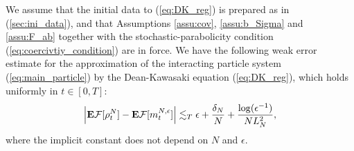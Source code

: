 \begin{thm}\label{thm:main_weak_error}We assume that the initial data to (\ref{eq:DK_reg}) is prepared as in (\ref{sec:ini_data}), and that Assumptions \ref{assu:cov}, \ref{assu:b_Sigma} and \ref{assu:F_ab} together with the stochastic-parabolicity condition (\ref{eq:coercivtiy_condition}) are in force. We have the following weak error  estimate for the approximation of the interacting particle system (\ref{eq:main_particle}) by the Dean-Kawasaki equation (\ref{eq:DK_reg}), which holds uniformly in $t \in [0,T]$: 
\begin{equation}\label{eq:main_error}
     \Big|\mathbf{E}\mathcal{F}[\rho^N_t] - \mathbf{E}\mathcal{F}[m_t^{N,\epsilon}]\Big| \lesssim_T \epsilon + \frac{\delta_N}{N} + \frac{\log(\epsilon^{-1})}{NL_N^2},
\end{equation}
where the implicit constant does not depend on $N$ and $\epsilon$. 
\end{thm}
